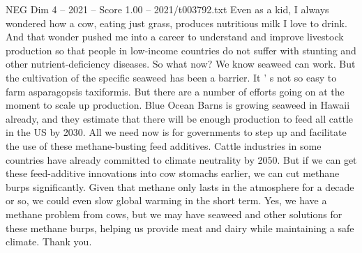 \begin{textsample}{NEG Dim 4 – 2021 – Score 1.00 – 2021/t003792.txt}
Even as a kid, I always wondered how a cow, eating just grass, produces nutritious milk I love to drink.
And that wonder pushed me into a career to understand and improve livestock production so that people in low-income countries do not suffer with stunting and other nutrient-deficiency diseases.
So what now?
We know seaweed can work.
But the cultivation of the specific seaweed has been a barrier.
It ' s not so easy to farm asparagopsis taxiformis.
But there are a number of efforts going on at the moment to scale up production.
Blue Ocean Barns is growing seaweed in Hawaii already, and they estimate that there will be enough production to feed all cattle in the US by 2030.
All we need now is for governments to step up and facilitate the use of these methane-busting feed additives.
Cattle industries in some countries have already committed to climate neutrality by 2050.
But if we can get these feed-additive innovations into cow stomachs earlier, we can cut methane burps significantly.
Given that methane only lasts in the atmosphere for a decade or so, we could even slow global warming in the short term.
Yes, we have a methane problem from cows, but we may have seaweed and other solutions for these methane burps, helping us provide meat and dairy while maintaining a safe climate.
Thank you.

\end{textsample}
